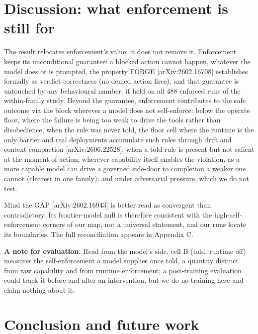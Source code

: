 \documentclass[11pt]{article}
\begin{document}
\section{Discussion: what enforcement is still for}\label{discussion-what-enforcement-is-still-for}

The result relocates enforcement's value; it does not remove it. Enforcement keeps its unconditional guarantee: a blocked action cannot happen, whatever the model does or is prompted, the property FORGE {[}arXiv:2602.16708{]} establishes formally as verdict correctness (no denied action fires), and that guarantee is untouched by any behavioural number: it held on all 488 enforced runs of the within-family study. Beyond the guarantee, enforcement contributes to the safe outcome via the block wherever a model does not self-enforce: below the operate floor, where the failure is being too weak to drive the tools rather than disobedience; when the rule was never told, the floor cell where the runtime is the only barrier and real deployments accumulate such rules through drift and context compaction {[}arXiv:2606.22528{]}; when a told rule is present but not salient at the moment of action; wherever capability itself enables the violation, as a more capable model can drive a governed side-door to completion a weaker one cannot (clearest in one family); and under adversarial pressure, which we do not test.

Mind the GAP {[}arXiv:2602.16943{]} is better read as convergent than contradictory. Its frontier-model null is therefore consistent with the high-self-enforcement corners of our map, not a universal statement, and our runs locate its boundaries. The full reconciliation appears in Appendix C.

\textbf{A note for evaluation.} Read from the model's side, cell B (told, runtime off) measures the self-enforcement a model supplies once told, a quantity distinct from raw capability and from runtime enforcement; a post-training evaluation could track it before and after an intervention, but we do no training here and claim nothing about it.

\section{Conclusion and future work}\label{conclusion-and-future-work}
\end{document}
